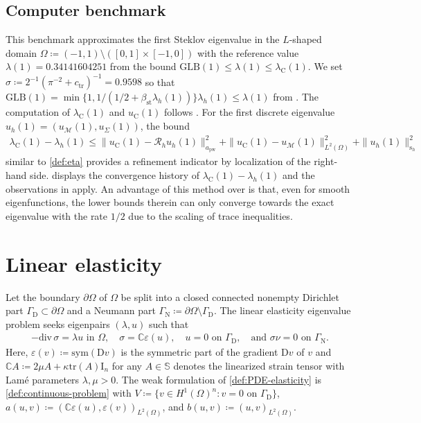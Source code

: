 \documentclass[a4paper]{amsart}
\numberwithin{equation}{section}
\renewcommand{\div}{\mathrm{div}}
\newcommand{\D}{\mathrm{D}}
\newcommand{\Mcal}{\mathcal{M}}
\newcommand{\s}{\mathrm{s}}
\newcommand{\pw}{\mathrm{pw}}
\theoremstyle{remark}
\theoremstyle{definition}
\theoremstyle{assumptionnoperiod}
\begin{document}
\subsection{Computer benchmark}\label{sec:num-ex-steklov}
This benchmark approximates the first Steklov eigenvalue in the $L$-shaped domain $\Omega \coloneqq (-1,1) \setminus ([0,1] \times [-1,0])$ with the reference value
$\lambda(1) = 0.34141604251$ from the bound $\mathrm{GLB}(1) \leq \lambda(1) \leq \lambda_\mathrm{C}(1)$. We set $\sigma \coloneqq 2^{-1}(\pi^{-2} + c_\mathrm{tr})^{-1} = 0.9598$ so that $\mathrm{GLB}(1) = \min\{1,1/(1/2 + \beta_\mathrm{st}\lambda_h(1))\}\lambda_h(1) \leq \lambda(1)$ from . The computation of $\lambda_\mathrm{C}(1)$ and $u_\mathrm{C}(1)$ follows . For the first discrete eigenvalue $u_h(1) = (u_\Mcal(1), u_\Sigma(1))$, the bound
\begin{align*}
	\lambda_\mathrm{C}(1) - \lambda_h(1) \leq \|u_\mathrm{C}(1) - \mathcal{R}_h u_h(1)\|^2_{a_\pw} + \|u_\mathrm{C}(1) - u_\Mcal(1)\|^2_{L^2(\Omega)} + \|u_h(1)\|_{\s_h}^2
\end{align*}
similar to \eqref{def:eta} provides a refinement indicator by localization of the right-hand side.  displays the convergence history of $\lambda_\mathrm{C}(1) - \lambda_h(1)$ and the observations in  apply.
An advantage of this method over \cite{YouXieLiu2019,Gallistl2023} is that, even for smooth eigenfunctions, the lower bounds therein can only converge towards the exact eigenvalue with the rate $1/2$ due to the scaling of trace inequalities.

\section{Linear elasticity}\label{sec:linear-elasticity}
Let the boundary $\partial \Omega$ of $\Omega$ be split into a closed connected nonempty Dirichlet part $\Gamma_\mathrm{D} \subset \partial \Omega$ and a Neumann part $\Gamma_\mathrm{N} \coloneqq \partial \Omega \setminus \Gamma_\mathrm{D}$.
The linear elasticity eigenvalue problem seeks eigenpairs $(\lambda,u)$ such that
\begin{align}\label{def:PDE-elasticity}
	-\div\,\sigma = \lambda u \text{ in } \Omega, \quad \sigma = \mathbb{C} \varepsilon (u), \quad u = 0 \text{ on } \Gamma_\mathrm{D}, \quad\text{and } \sigma \nu = 0 \text{ on } \Gamma_\mathrm{N}.
\end{align}
Here, $\varepsilon(v) \coloneqq \mathrm{sym}(\D v)$ is the symmetric part of the gradient $\D v$ of $v$ and $\mathbb{C} A \coloneqq 2 \mu A + \kappa \mathrm{tr}(A) \mathrm{I}_n$ for any $A \in \mathbb{S}$ denotes the linearized strain tensor with Lam\'e parameters $\lambda, \mu > 0$.
The weak formulation of \eqref{def:PDE-elasticity} is \eqref{def:continuous-problem} with $V \coloneqq \{v \in H^1(\Omega)^n : v = 0 \text{ on } \Gamma_\mathrm{D}\}$, $a(u,v) \coloneqq (\mathbb{C} \varepsilon(u), \varepsilon(v))_{L^2(\Omega)}$, and $b(u,v) \coloneqq (u,v)_{L^2(\Omega)}$.
\end{document}
